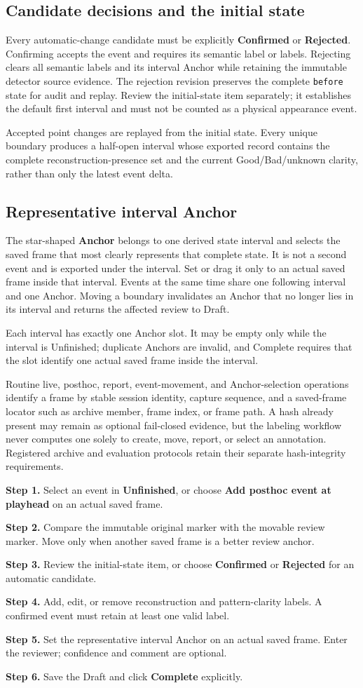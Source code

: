 \documentclass[10pt,a4paper]{article}
\newcommand{\step}[2]{
  \begin{tcolorbox}[
    enhanced,colback=white,colframe=ManualLine,boxrule=0.5pt,arc=1.5mm,
    left=2.5mm,right=2.5mm,top=1.5mm,bottom=1.5mm,before skip=1.5mm,after skip=1.5mm]
    \textcolor{ManualBlue}{\textbf{Step #1.}} #2
  \end{tcolorbox}
}
\begin{document}
\subsection{Candidate decisions and the initial state}
Every automatic-change candidate must be explicitly \textbf{Confirmed} or \textbf{Rejected}. Confirming accepts the event and requires its semantic label or labels. Rejecting clears all semantic labels and its interval Anchor while retaining the immutable detector source evidence. The rejection revision preserves the complete \texttt{before} state for audit and replay. Review the initial-state item separately; it establishes the default first interval and must not be counted as a physical appearance event.

Accepted point changes are replayed from the initial state. Every unique boundary produces a half-open interval whose exported record contains the complete reconstruction-presence set and the current Good/Bad/unknown clarity, rather than only the latest event delta.

\subsection{Representative interval Anchor}
The star-shaped \textbf{Anchor} belongs to one derived state interval and selects the saved frame that most clearly represents that complete state. It is not a second event and is exported under the interval. Set or drag it only to an actual saved frame inside that interval. Events at the same time share one following interval and one Anchor. Moving a boundary invalidates an Anchor that no longer lies in its interval and returns the affected review to Draft.

Each interval has exactly one Anchor slot. It may be empty only while the interval is Unfinished; duplicate Anchors are invalid, and Complete requires that the slot identify one actual saved frame inside the interval.

Routine live, posthoc, report, event-movement, and Anchor-selection operations identify a frame by stable session identity, capture sequence, and a saved-frame locator such as archive member, frame index, or frame path. A hash already present may remain as optional fail-closed evidence, but the labeling workflow never computes one solely to create, move, report, or select an annotation. Registered archive and evaluation protocols retain their separate hash-integrity requirements.

\step{1}{Select an event in \textbf{Unfinished}, or choose \textbf{Add posthoc event at playhead} on an actual saved frame.}
\step{2}{Compare the immutable original marker with the movable review marker. Move only when another saved frame is a better review anchor.}
\step{3}{Review the initial-state item, or choose \textbf{Confirmed} or \textbf{Rejected} for an automatic candidate.}
\step{4}{Add, edit, or remove reconstruction and pattern-clarity labels. A confirmed event must retain at least one valid label.}
\step{5}{Set the representative interval Anchor on an actual saved frame. Enter the reviewer; confidence and comment are optional.}
\step{6}{Save the Draft and click \textbf{Complete} explicitly.}
\end{document}
